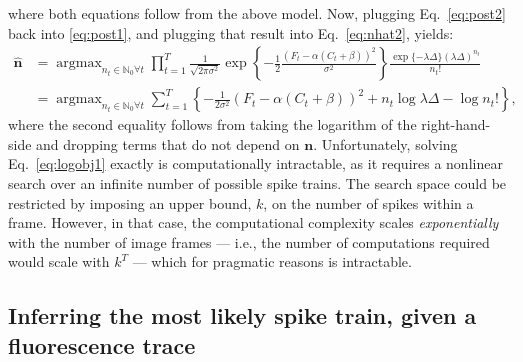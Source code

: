 \documentclass{article}
\providecommand{\ve}[1]{\boldsymbol{#1}}
\DeclareMathOperator*{\argmax}{argmax}
\newcommand{\bn}{\ve{n}}
\newcommand{\hbn}{\widehat{\ve{n}}}
\newcommand{\mN}{\mathcal{N}}
\newcommand{\Del}{\Delta}
\newcommand{\sig}{\sigma}
\newcommand{\lam}{\lambda}
\newcommand{\anx}{\argmax_{n_t \in \mathbb{N}_0 \forall t}}
\begin{document}
where both equations follow from the above model.  Now, plugging Eq.~\eqref{eq:post2} back into \eqref{eq:post1}, and plugging that result into Eq.~\eqref{eq:nhat2}, yields:
\begin{subequations}  \label{eq:obj}
\begin{align}
\hbn 	&= \anx \prod_{t=1}^T \frac{1}{\sqrt{2 \pi \sig^2}} \exp \left\{-\frac{1}{2}\frac{(F_t - \alpha (C_t + \beta))^2}{\sig^2}\right\} \frac{\exp\{-\lam\Del\} (\lam\Del)^{n_t}}{n_t!}
\label{eq:obj1}\\ &= \anx  \sum_{t=1}^T \left\{ -\frac{1}{2 \sig^2}(F_t - \alpha(C_t + \beta))^2  +  n_t \log \lam \Del - \log n_t! \right\}, \label{eq:logobj1}
\end{align} 
\end{subequations}
\noindent where the second equality follows from taking the logarithm of the right-hand-side and dropping terms that do not depend on $\bn$.  Unfortunately, solving Eq.~\eqref{eq:logobj1} exactly is computationally intractable, as it requires a nonlinear search over an infinite number of  possible spike trains.  The search space could be restricted by imposing an upper bound, $k$, on the number of spikes within a frame.  However, in that case, the computational complexity scales \emph{exponentially} with the number of image frames --- i.e.,  the number of computations required would scale with $k^T$ --- which for pragmatic reasons is intractable.




\subsection{Inferring the most likely spike train, given a fluorescence trace} \label{sec:inf}
\end{document}
